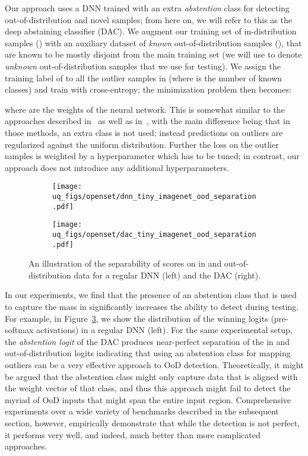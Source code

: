 \documentclass[accepted]{uai2021} \pdfoutput=1
\begin{document}
Our approach uses a DNN trained  with an extra \textit{abstention} class for detecting out-of-distribution and novel samples; from here on, we will refer to this as the deep abstaining classifier (DAC).  We augment our training set of in-distribution samples () with an auxiliary dataset of \textit{known} out-of-distribution samples (), that are known to be mostly disjoint from the main training set (we will use  to denote \textit{unknown} out-of-distribution samples that we use for testing).  We assign the training label of  to all the outlier samples in  (where  is the number of known classes) and train with cross-entropy; the minimization problem then becomes:

where  are the weights of the neural network. This is somewhat similar to the approaches described in~\cite{hendrycks2018deep} as well as in~\cite{lee2017training}, with the main difference being that in those methods, an extra class is not used; instead predictions on outliers are regularized against the uniform distribution. 
Further the loss on the outlier samples is weighted by a hyperparameter  which has to be tuned; in contrast, our approach does not introduce any additional hyperparameters. 

\begin{figure}[htbp]
	\centering
	\begin{subfigure}[b]{0.45\textwidth}
		\texttt{[image: uq\_figs/openset/dnn\_tiny\_imagenet\_ood\_separation.pdf]}
\label{fig:dnn_dist}
	\end{subfigure}
\hspace{0.1in}
	\begin{subfigure}[b]{0.45\textwidth}
		\texttt{[image: uq\_figs/openset/dac\_tiny\_imagenet\_ood\_separation.pdf]}
\label{fig:dac_dist}
	\end{subfigure}
\vspace{-0.2in}
	\caption{An illustration of the separability of  scores on in and out-of-distribution data for a regular DNN (left) and the DAC (right).}\label{fig:openset_score_dist}
\end{figure}


In our experiments, we find that the presence of an abstention class that is used to capture the mass in  significantly increases the ability to detect  during testing. For example, in Figure~\ref{fig:openset_score_dist}, we show the distribution of the winning logits (pre-softmax activations) in a regular DNN (left). For the same experimental setup, the \textit{abstention logit} of the DAC produces near-perfect separation of the in and out-of-distribution logits indicating that using an abstention class for mapping outliers can be a very effective approach to OoD detection.  Theoretically, it might be argued that the abstention class might only capture data that is aligned with the weight vector of that class, and thus this approach might fail to detect the myriad of OoD inputs that might span the entire input region. Comprehensive experiments over a wide variety of benchmarks described in the subsequent section, however,  empirically demonstrate that while the detection is not perfect, it performs very well, and indeed, much better than more complicated approaches.
 
\end{document}
